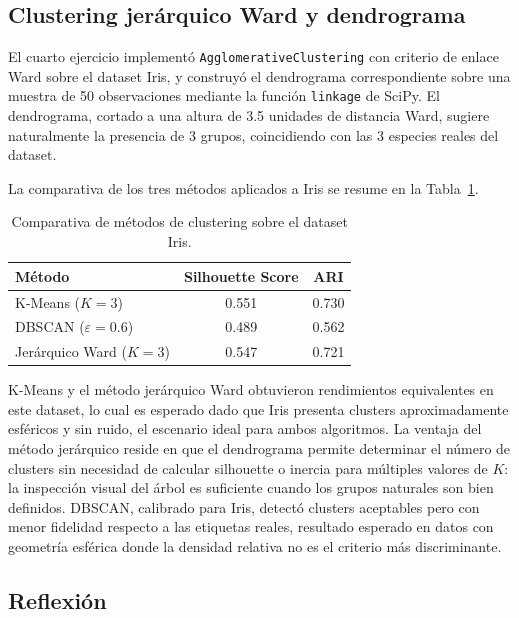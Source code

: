 \documentclass[12pt, a4paper]{article}
\begin{document}
\subsection{Clustering jerárquico Ward y dendrograma}

El cuarto ejercicio implementó \texttt{AgglomerativeClustering} con criterio de enlace Ward sobre el dataset Iris, y construyó el dendrograma correspondiente sobre una muestra de 50 observaciones mediante la función \texttt{linkage} de SciPy. El dendrograma, cortado a una altura de 3.5 unidades de distancia Ward, sugiere naturalmente la presencia de 3 grupos, coincidiendo con las 3 especies reales del dataset.

La comparativa de los tres métodos aplicados a Iris se resume en la Tabla~\ref{tab:clustering}.

\begin{table}[h!]
  \centering
  \caption{Comparativa de métodos de clustering sobre el dataset Iris.}
  \label{tab:clustering}
  \begin{tabular}{lcc}
    \toprule
    \textbf{Método} & \textbf{Silhouette Score} & \textbf{ARI} \\
    \midrule
    K-Means ($K=3$)          & 0.551 & 0.730 \\
    DBSCAN ($\varepsilon=0.6$) & 0.489 & 0.562 \\
    Jerárquico Ward ($K=3$)  & 0.547 & 0.721 \\
    \bottomrule
  \end{tabular}
\end{table}

K-Means y el método jerárquico Ward obtuvieron rendimientos equivalentes en este dataset, lo cual es esperado dado que Iris presenta clusters aproximadamente esféricos y sin ruido, el escenario ideal para ambos algoritmos. La ventaja del método jerárquico reside en que el dendrograma permite determinar el número de clusters sin necesidad de calcular silhouette o inercia para múltiples valores de $K$: la inspección visual del árbol es suficiente cuando los grupos naturales son bien definidos. DBSCAN, calibrado para Iris, detectó clusters aceptables pero con menor fidelidad respecto a las etiquetas reales, resultado esperado en datos con geometría esférica donde la densidad relativa no es el criterio más discriminante.

\subsection{Reflexión}
\end{document}
